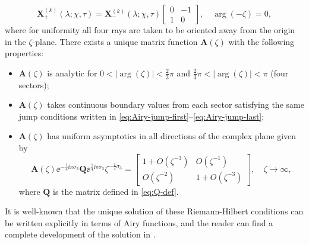 \begin{equation}
\mathbf{X}^{(k)}_+(\lambda;\chi,\tau)=\mathbf{X}^{(k)}_-(\lambda;\chi,\tau)\begin{bmatrix}0 & -1\\
1 & 0\end{bmatrix},\quad\arg(-\zeta)=0,
\label{eq:Airy-jump-last}
\end{equation}
where for uniformity all four rays are taken to be oriented away from the origin in the $\zeta$-plane.
There exists a unique matrix function $\mathbf{A}(\zeta)$ with the following properties:
\begin{itemize}
\item
$\mathbf{A}(\zeta)$ is analytic for $0<|\arg(\zeta)|<\tfrac{2}{3}\pi$ and $\tfrac{2}{3}\pi<|\arg(\zeta)|<\pi$ (four sectors);
\item $\mathbf{A}(\zeta)$ takes continuous boundary values from each sector satisfying the same jump conditions written in \eqref{eq:Airy-jump-first}--\eqref{eq:Airy-jump-last};
\item $\mathbf{A}(\zeta)$ has uniform asymptotics in all directions of the complex plane given by 
\begin{equation}
\mathbf{A}(\zeta)\ee^{-\frac{1}{4}\ii\pi\sigma_3}\mathbf{Q}\ee^{\frac{1}{4}\ii\pi\sigma_3}\zeta^{-\frac{1}{4}\sigma_3}=\begin{bmatrix}1+O(\zeta^{-3}) & O(\zeta^{-1})\\O(\zeta^{-2}) & 1+O(\zeta^{-3})\end{bmatrix},\quad\zeta\to\infty,
\end{equation}
where $\mathbf{Q}$ is the matrix defined in \eqref{eq:Q-def}.
\end{itemize}
It is well-known that the unique solution of these Riemann-Hilbert conditions can be written explicitly in terms of Airy functions, and the reader can find a complete development of the solution in \cite[Appendix B]{BothnerM20}.
